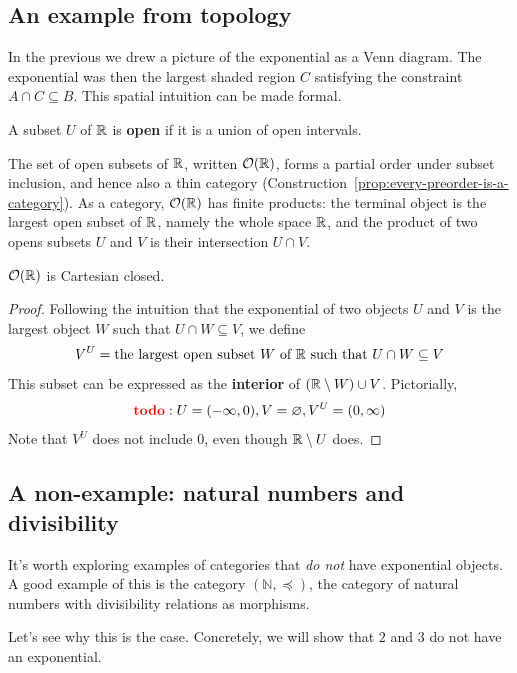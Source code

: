 \subsection{An example from topology}

In the previous we drew a picture of the exponential as a Venn diagram.
The exponential was then the largest shaded region \(C\) satisfying
the constraint \(A \cap C \subseteq B\).
This spatial intuition can be made formal.

\begin{definition}
  A subset \(U\) of \(\mathbb R\) is \textbf{open}
  if it is a union of open intervals.
\end{definition}

The set of open subsets of \(\mathbb R\), written \(\mathcal O(\mathbb R)\),
forms a partial order under subset inclusion,
and hence also a thin category (Construction~\ref{prop:every-preorder-is-a-category}).
As a category, \(\mathcal O(\mathbb R)\) has finite products:
the terminal object is the largest open subset of \(\mathbb R\),
namely the whole space \(\mathbb R\),
and the product of two opens subsets \(U\) and \(V\)
is their intersection \(U\cap V\).

\begin{proposition}
  \(\mathcal O(\mathbb R)\) is Cartesian closed.
\end{proposition}
\begin{proof}
  Following the intuition that the exponential of two objects \(U\) and \(V\)
  is the largest object \(W\) such that \(U\cap W \subseteq V\),
  we define
  \[
  V^U = \text{the largest open subset \(W\) of \(\mathbb R\) such that \(U\cap W\subseteq V\)}
  \]
  This subset can be expressed as the \textbf{interior}
  of \((\mathbb R\setminus W) \cup V\). Pictorially,
  \[{\color{red}\bf todo}: U=(-\infty,0),V=\varnothing,V^U=(0,\infty)\]
  Note that \(V^U\) does not include \(0\), even though \(\mathbb R\setminus U\) does.
\end{proof}

\subsection{A non-example: natural numbers and divisibility}
It's worth exploring examples of categories that \emph{do not}
have exponential objects. A good example of this 
is the category $(\mathbb{N}, \preceq)$, the category of 
natural numbers with divisibility relations as morphisms.

Let's see why this is the case.
Concretely, we will show that \(2\) and \(3\)
do not have an exponential.

